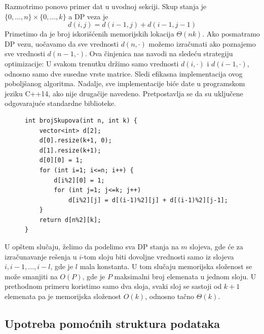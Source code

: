 \documentclass[a4paper,12pt]{article}
\numberwithin{equation}{subsection}
\begin{document}
Razmotrimo ponovo primer dat u uvodnoj sekciji. Skup stanja je $\{0, \ldots, n\} \times \{0, \ldots, k\}$ a DP veza je
$$
	d(i, j) = d(i-1, j) + d(i-1, j-1)
$$
Primetimo da je broj iskori\v s\' cenih memorijskih lokacija $\Theta(nk)$. Ako posmatramo DP vezu, uo\v cavamo da sve vrednosti $d(n, \cdot)$ mo\v zemo izra\v cunati ako poznajemo sve vrednosti $d(n-1, \cdot)$. Ova \v cinjenica nas navodi na slede\' cu strategiju optimizacije: U svakom trenutku dr\v zimo samo vrednosti $d(i, \cdot)$ i $d(i-1, \cdot)$, odnosno samo dve susedne vrste matrice. Sledi efikasna implementacija ovog pobolj\v sanog algoritma. Nadalje, sve implementacije bi\' ce date u programskom jeziku C++14, ako nije druga\v cije navedeno. Pretpostavlja se da su uklju\v cene odgovaraju\' ce standardne biblioteke.

\begin{figure}[H]
\begin{verbatim}
int brojSkupova(int n, int k) {
    vector<int> d[2];
    d[0].resize(k+1, 0);
    d[1].resize(k+1);
    d[0][0] = 1;
    for (int i=1; i<=n; i++) {
        d[i%2][0] = 1;
        for (int j=1; j<=k; j++)
            d[i%2][j] = d[(i-1)%2][j] + d[(i-1)%2][j-1];
    }
    return d[n%2][k];
}
\end{verbatim}
\end{figure}

U op\v stem slu\v caju, \v zelimo da podelimo sva DP stanja na $m$ slojeva, gde
\' ce za izra\v cunavanje re\v senja u $i$-tom sloju biti dovoljne vrednosti samo iz slojeva $i, i-1, \ldots, i-l$, gde je $l$ mala konstanta. U tom slu\v caju memorijska slo\v zenost se mo\v ze smanjiti na $O(P)$, gde je $P$ maksimalni broj elemenata u jednom sloju. U prethodnom primeru koristimo samo dva sloja, svaki sloj se sastoji od $k+1$ elemenata pa je memorijska slo\v zenost $O(k)$, odnosno ta\v cno $\Theta(k)$.

\subsection{Upotreba pomo\' cnih struktura podataka}
\end{document}
